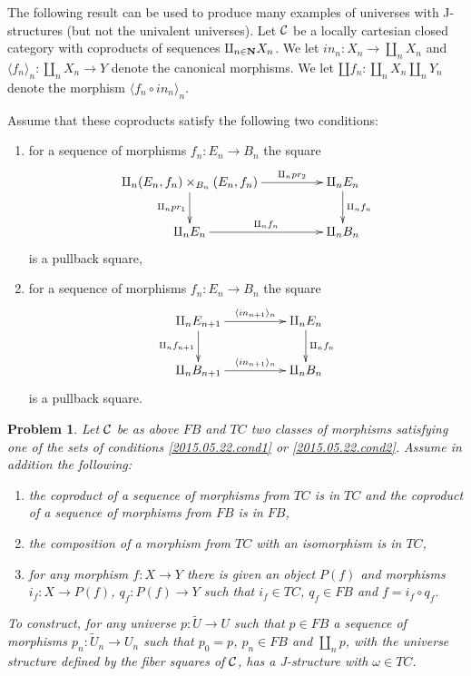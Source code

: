 \documentclass[12pt]{article}
\numberwithin{equation}{section}
\newtheorem{problem}[proposition]{Problem}
\newcommand{\llabel}[1]{\label{#1}}
\newcommand{\sr}{\rightarrow}
\newcommand{\nn}{{\bf N\rm}}
\newcommand{\wt}{\widetilde}
\begin{document}
The following result can be used to produce many examples of universes with
J-structures (but not the univalent universes). Let $\cal C$ be a locally
cartesian closed category with coproducts of sequences
$\amalg_{n\in\nn}X_n$. We let $in_n:X_n\sr \amalg_n X_n$ and $\langle f_n
\rangle_{n} : \amalg_n X_n\sr Y$ denote the canonical morphisms. We let $\amalg
f_n : \amalg_n X_n \amalg_n Y_n$ denote the morphism $\langle f_n\circ in_n
\rangle_{n}$.

Assume that these coproducts satisfy the following two conditions:
%
\begin{enumerate}
\item for a sequence of morphisms $f_n:E_n\sr B_n$ the square
%
$$
\begin{xy}
          \xymatrix@C=4pc{ \amalg_n (E_n,f_n)\times_{B_n}(E_n,f_n)
            \ar[r]^-{\amalg_n pr_2} \ar[d]_{\amalg_n pr_1} & \amalg_n E_n
            \ar[d]^{\amalg_n f_n}\\ \amalg_n E_n \ar[r]^-{\amalg_n f_n} &
            \amalg_n B_n }
\end{xy}
$$
%
is a pullback square,
%
\item for a sequence of morphisms $f_n:E_n\sr B_n$ the square
%
$$
\begin{xy}
          \xymatrix@C=4pc{ \amalg_n E_{n+1} \ar[r]^-{\langle in_{n+1}
              \rangle_{n}} \ar[d]_{\amalg_n f_{n+1}} & \amalg_n E_n
            \ar[d]^{\amalg_n f_n}\\ \amalg_n B_{n+1} \ar[r]^-{\langle in_{n+1}
              \rangle_{n}} & \amalg_n B_n }
\end{xy}
$$
%
is a pullback square.
\end{enumerate}
%
%
\begin{problem}
\llabel{2015.05.22.th2} Let $\cal C$ be as above $FB$ and $TC$ two classes of
morphisms satisfying one of the sets of conditions \ref{2015.05.22.cond1} or
\ref{2015.05.22.cond2}. Assume in addition the following:
%
\begin{enumerate}
\item the coproduct of a sequence of morphisms from $TC$ is in $TC$ and the
  coproduct of a sequence of morphisms from $FB$ is in $FB$,
\item the composition of a morphism from $TC$ with an isomorphism is in $TC$,
\item for any morphism $f: X \sr Y$ there is given an object $P(f)$ and
  morphisms $i_f:X\sr P(f)$, $q_f:P(f)\sr Y$ such that $i_f\in TC$, $q_f\in FB$
  and $f=i_f\circ q_f$.
\end{enumerate}
%
To construct, for any universe $p: \wt{U}\sr U$ such that $p\in FB$ a sequence
of morphisms $p_n:\wt{U}_n\sr U_n$ such that $p_0=p$, $p_n\in FB$ and $\amalg_n
p$, with the universe structure defined by the fiber squares of $\cal C$, has a
J-structure with $\omega\in TC$.
\end{problem}
\end{document}
